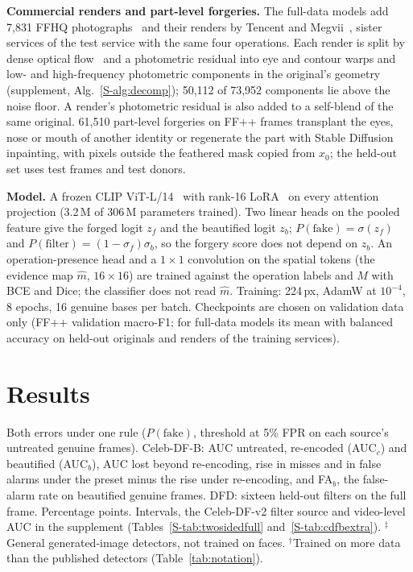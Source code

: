 \documentclass[conference]{IEEEtran}
\begin{document}
\textbf{Commercial renders and part-level forgeries.} The full-data models add 7,831 FFHQ photographs~\cite{ffhq} and their
renders by Tencent and Megvii~\cite{retouchingffhq}, sister services of the test service with the same four operations. Each
render is split by dense optical flow~\cite{dis} and a photometric residual into eye and contour warps and low- and
high-frequency photometric components in the original's geometry (supplement, Alg.~\ref{S-alg:decomp}); 50,112 of 73,952
components lie above the noise floor. A render's photometric residual is also added to a self-blend of the same original.
61,510 part-level forgeries on FF++ frames transplant the eyes, nose or mouth of another identity or regenerate the part with
Stable Diffusion inpainting, with pixels outside the feathered mask copied from $x_0$; the held-out set uses test frames and
test donors.

\textbf{Model.} A frozen CLIP ViT-L/14~\cite{clip} with rank-16 LoRA~\cite{lora} on every attention projection (3.2\,M of
306\,M parameters trained). Two linear heads on the pooled feature give the forged logit $z_f$ and the beautified logit $z_b$;
$P(\text{fake})=\sigma(z_f)$ and $P(\text{filter})=(1-\sigma_f)\sigma_b$, so the forgery score does not depend on $z_b$. An
operation-presence head and a $1\times1$ convolution on the spatial tokens (the evidence map $\hat m$, $16\times16$) are
trained against the operation labels and $M$ with BCE and Dice; the classifier does not read $\hat m$. Training: 224\,px,
AdamW at $10^{-4}$, 8 epochs, 16 genuine bases per batch. Checkpoints are chosen on validation data only (FF++ validation
macro-F1; for full-data models its mean with balanced accuracy on held-out originals and renders of the training services).

\section{Results}
\label{sec:results}
\begin{table}[t]
\centering
\caption{Both errors under one rule ($P(\text{fake})$, threshold at 5\% FPR on each source's untreated genuine frames).
Celeb-DF-B: AUC untreated, re-encoded (AUC$_c$) and beautified (AUC$_b$), AUC lost beyond re-encoding, rise in misses and in
false alarms under the preset minus the rise under re-encoding, and FA$_b$, the false-alarm rate on beautified genuine frames.
DFD: sixteen held-out filters on the full frame. Percentage points. Intervals, the Celeb-DF-v2 filter source and video-level
AUC in the supplement (Tables~\ref{S-tab:twosidedfull} and~\ref{S-tab:cdfbextra}). $^\ddagger$General generated-image detectors,
not trained on faces. $^\dagger$Trained on more data than the published detectors (Table~\ref{tab:notation}).}
\label{tab:twosided}
\scriptsize
\setlength{\tabcolsep}{3pt}
\begin{adjustbox}{max width=\textwidth}\end{adjustbox}
\end{table}
\end{document}
